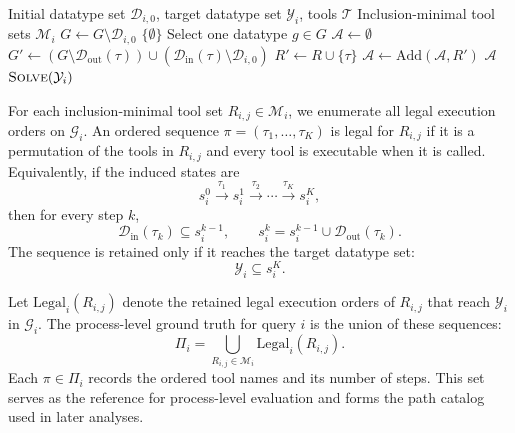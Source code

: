 \begin{algorithm}[t]
\caption{Computing inclusion-minimal tool sets}
\label{alg:minimal-tool-sets}
\begin{algorithmic}[1]
\Require Initial datatype set $\mathcal{D}_{i,0}$, target datatype set $\mathcal{Y}_i$, tools $\mathcal{T}$
\Ensure Inclusion-minimal tool sets $\mathcal{M}_i$
    \State $G \gets G \setminus \mathcal{D}_{i,0}$
        \State \Return $\{\emptyset\}$
    \EndIf
    \State Select one datatype $g \in G$
    \State $\mathcal{A} \gets \emptyset$
        \State $G' \gets (G \setminus \mathcal{D}_{\mathrm{out}}(\tau)) \cup (\mathcal{D}_{\mathrm{in}}(\tau) \setminus \mathcal{D}_{i,0})$
            \State $R' \gets R \cup \{\tau\}$
            \State $\mathcal{A} \gets \mathrm{Add}(\mathcal{A}, R')$
        \EndFor
    \EndFor
    \State \Return $\mathcal{A}$
\EndFunction
\State \Return $\Call{Solve}{\mathcal{Y}_i}$
\end{algorithmic}
\end{algorithm}

For each inclusion-minimal tool set $R_{i,j} \in \mathcal{M}_i$, we enumerate all legal execution orders on $\mathcal{G}_i$. 
An ordered sequence $\pi=(\tau_1,\ldots,\tau_K)$ is legal for $R_{i,j}$ if it is a permutation of the tools in $R_{i,j}$ and every tool is executable when it is called. 
Equivalently, if the induced states are
\begin{equation}
s_i^0 \xrightarrow{\tau_1} s_i^1 \xrightarrow{\tau_2} \cdots \xrightarrow{\tau_K} s_i^K,
\end{equation}
then for every step $k$,
\begin{equation}
\mathcal{D}_{\mathrm{in}}(\tau_k) \subseteq s_i^{k-1},
\qquad
s_i^k = s_i^{k-1} \cup \mathcal{D}_{\mathrm{out}}(\tau_k).
\end{equation}
The sequence is retained only if it reaches the target datatype set:
\begin{equation}
\mathcal{Y}_i \subseteq s_i^K.
\end{equation}

Let $\mathrm{Legal}_i(R_{i,j})$ denote the retained legal execution orders of $R_{i,j}$ that reach $\mathcal{Y}_i$ in $\mathcal{G}_i$. 
The process-level ground truth for query $i$ is the union of these sequences:
\begin{equation}
\Pi_i = \bigcup_{R_{i,j}\in\mathcal{M}_i} \mathrm{Legal}_i(R_{i,j}).
\end{equation}
Each $\pi \in \Pi_i$ records the ordered tool names and its number of steps. 
This set serves as the reference for process-level evaluation and forms the path catalog used in later analyses.

